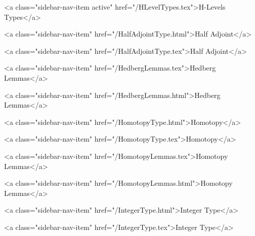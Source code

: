       
        
          <a class="sidebar-nav-item active" href="/HLevelTypes.tex">H-Levels Types</a>
        
      
    
      
        
          <a class="sidebar-nav-item" href="/HalfAdjointType.html">Half Adjoint</a>
        
      
    
      
        
          <a class="sidebar-nav-item" href="/HalfAdjointType.tex">Half Adjoint</a>
        
      
    
      
        
          <a class="sidebar-nav-item" href="/HedbergLemmas.tex">Hedberg Lemmas</a>
        
      
    
      
        
          <a class="sidebar-nav-item" href="/HedbergLemmas.html">Hedberg Lemmas</a>
        
      
    
      
        
          <a class="sidebar-nav-item" href="/HomotopyType.html">Homotopy</a>
        
      
    
      
        
          <a class="sidebar-nav-item" href="/HomotopyType.tex">Homotopy</a>
        
      
    
      
        
          <a class="sidebar-nav-item" href="/HomotopyLemmas.tex">Homotopy Lemmas</a>
        
      
    
      
        
          <a class="sidebar-nav-item" href="/HomotopyLemmas.html">Homotopy Lemmas</a>
        
      
    
      
        
          <a class="sidebar-nav-item" href="/IntegerType.html">Integer Type</a>
        
      
    
      
        
          <a class="sidebar-nav-item" href="/IntegerType.tex">Integer Type</a>
        
      
    
